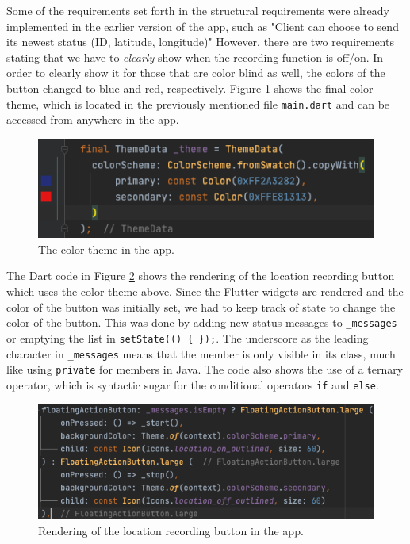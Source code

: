 \documentclass{article}
\begin{document}
Some of the requirements set forth in the structural requirements were already implemented in the earlier version of the app, such as "Client can choose to send its newest status (ID, latitude, longitude)" However, there are two requirements stating that we have to \emph{clearly} show when the recording function is off/on. In order to clearly show it for those that are color blind as well, the colors of the button changed to blue and red, respectively. Figure \ref{fig:color_theme} shows the final color theme, which is located in the previously mentioned file \verb|main.dart| and can be accessed from anywhere in the app. 

\begin{figure}[H]
    \centering
    \includegraphics[scale=0.50]{graphics/color_theme.png}
    \caption{The color theme in the app.}
    \label{fig:color_theme}
\end{figure}

The Dart code in Figure \ref{fig:location_toggle} shows the rendering of the location recording button which uses the color theme above. Since the Flutter widgets are rendered and the color of the button was initially set, we had to keep track of state to change the color of the button. This was done by adding new status messages to \verb|_messages| or emptying the list in \verb|setState(() { });|. The underscore as the leading character in \verb|_messages| means that the member is only visible in its class, much like using \verb|private| for members in Java. The code also shows the use of a ternary operator, which is syntactic sugar for the conditional operators \verb|if| and \verb|else|.
\begin{figure}[H]
    \centering
    \includegraphics[scale=0.50]{graphics/location_toggle.png}
    \caption{Rendering of the location recording button in the app.}
    \label{fig:location_toggle}
\end{figure}
\end{document}
